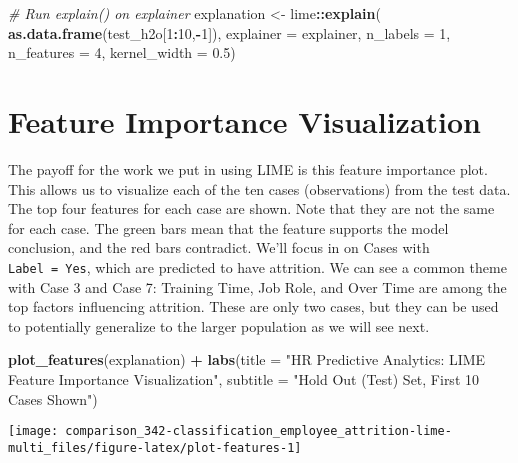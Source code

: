 \documentclass[]{book}
\newenvironment{Shaded}{\begin{snugshade}}{\end{snugshade}}
\newcommand{\CommentTok}[1]{\textcolor[rgb]{0.56,0.35,0.01}{\textit{#1}}}
\newcommand{\DataTypeTok}[1]{\textcolor[rgb]{0.13,0.29,0.53}{#1}}
\newcommand{\DecValTok}[1]{\textcolor[rgb]{0.00,0.00,0.81}{#1}}
\newcommand{\FloatTok}[1]{\textcolor[rgb]{0.00,0.00,0.81}{#1}}
\newcommand{\KeywordTok}[1]{\textcolor[rgb]{0.13,0.29,0.53}{\textbf{#1}}}
\newcommand{\NormalTok}[1]{#1}
\newcommand{\OperatorTok}[1]{\textcolor[rgb]{0.81,0.36,0.00}{\textbf{#1}}}
\newcommand{\StringTok}[1]{\textcolor[rgb]{0.31,0.60,0.02}{#1}}
\begin{document}
\begin{Shaded}
\begin{Highlighting}[]
\CommentTok{# Run explain() on explainer}
\NormalTok{explanation <-}\StringTok{ }\NormalTok{lime}\OperatorTok{::}\KeywordTok{explain}\NormalTok{(}
    \KeywordTok{as.data.frame}\NormalTok{(test_h2o[}\DecValTok{1}\OperatorTok{:}\DecValTok{10}\NormalTok{,}\OperatorTok{-}\DecValTok{1}\NormalTok{]), }
    \DataTypeTok{explainer    =}\NormalTok{ explainer, }
    \DataTypeTok{n_labels     =} \DecValTok{1}\NormalTok{, }
    \DataTypeTok{n_features   =} \DecValTok{4}\NormalTok{,}
    \DataTypeTok{kernel_width =} \FloatTok{0.5}\NormalTok{)}
\end{Highlighting}
\end{Shaded}

\hypertarget{feature-importance-visualization}{%
\section{Feature Importance Visualization}\label{feature-importance-visualization}}

The payoff for the work we put in using LIME is this feature importance plot. This allows us to visualize each of the ten cases (observations) from the test data. The top four features for each case are shown. Note that they are not the same for each case. The green bars mean that the feature supports the model conclusion, and the red bars contradict. We'll focus in on Cases with \texttt{Label\ =\ Yes}, which are predicted to have attrition. We can see a common theme with Case 3 and Case 7: Training Time, Job Role, and Over Time are among the top factors influencing attrition. These are only two cases, but they can be used to potentially generalize to the larger population as we will see next.

\begin{Shaded}
\begin{Highlighting}[]
\KeywordTok{plot_features}\NormalTok{(explanation) }\OperatorTok{+}
\StringTok{    }\KeywordTok{labs}\NormalTok{(}\DataTypeTok{title =} \StringTok{"HR Predictive Analytics: LIME Feature Importance Visualization"}\NormalTok{,}
         \DataTypeTok{subtitle =} \StringTok{"Hold Out (Test) Set, First 10 Cases Shown"}\NormalTok{)}
\end{Highlighting}
\end{Shaded}

\begin{center}\texttt{[image: comparison\_342-classification\_employee\_attrition-lime-multi\_files/figure-latex/plot-features-1]} \end{center}
\end{document}

